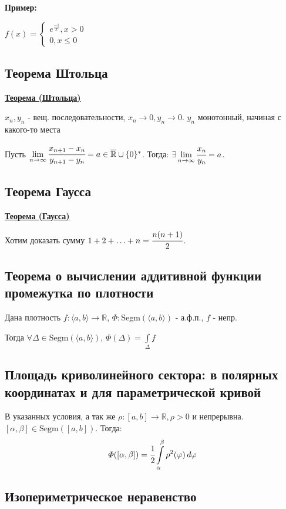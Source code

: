 \documentclass{article}
\newcommand{\integral}[2]{\displaystyle\int\limits_{#1}^{#2}}
\newcommand{\Segm}{\text{Segm}}
\newcommand{\thmm}[1]{\underline{\textbf{#1}}}
\begin{document}
\textbf{Пример:}

$f(x) = \begin{cases}
    e^\frac{-1}{x}, x>0\\
    0,x\leq 0
\end{cases}$

\subsection{Теорема Штольца}

\thmm{Теорема (Штольца)}

$x_n,y_n$ - вещ. последовательности, $x_n \rightarrow 0 , y_n \rightarrow 0$. $y_n$ монотонный, начиная с какого-то места

Пусть $\lim\limits_{n\rightarrow \infty} \cfrac{x_{n+1}-x_n}{y_{n+1}-y_n} =  a\in \overline{\mathbb{R}}\cup \{0\}^*$. Тогда: $\exists \lim\limits_{n \rightarrow\infty}\cfrac{x_n}{y_n} = a$.




\subsection{Теорема Гаусса}

\thmm{Теорема (Гаусса)}

Хотим доказать сумму $1 + 2 + \ldots + n = \cfrac{n(n+1)}{2}$.

\subsection{Теорема о вычислении аддитивной функции промежутка по плотности}

Дана плотность
$f:\langle a,b\rangle \rightarrow \mathbb{R}$, $\varPhi: \Segm(\langle a,b\rangle)$ - а.ф.п., $f$ - непр.

Тогда $\forall \Delta \in \Segm(\langle a,b\rangle) $, $\varPhi(\Delta) = \integral{\Delta}{}f$

\subsection{Площадь криволинейного сектора: в полярных координатах и для параметрической кривой}

В указанных условия, а так же $\rho: [a,b] \rightarrow \mathbb{R}, \rho>0$ и непрерывна. $[\alpha,\beta]\in \Segm([a,b])$. Тогда: $$\varPhi([\alpha,\beta]) = \cfrac{1}{2}\integral{\alpha}{\beta}\rho^2(\varphi) \, d\varphi$$
\subsection{Изопериметрическое неравенство}
\end{document}
